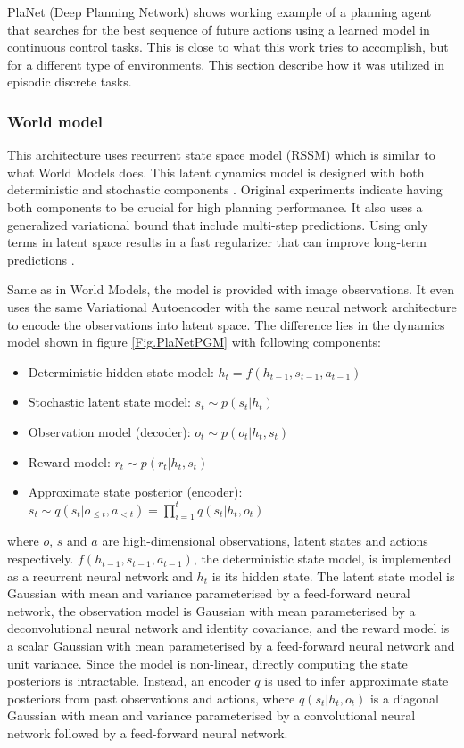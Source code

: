 PlaNet (Deep Planning Network) \cite{Algo.PlaNet} shows working example of a planning agent that searches for the best sequence of future actions using a learned model in continuous control tasks. This is close to what this work tries to accomplish, but for a different type of environments. This section describe how it was utilized in episodic discrete tasks.

\subsubsection{World model}

This architecture uses recurrent state space model (RSSM) which is similar to what World Models does. This latent dynamics model is designed with both deterministic and stochastic components \cite{Algo.FastGenerativeModels}. Original experiments indicate having both components to be crucial for high planning performance. It also uses a generalized variational bound that include multi-step predictions. Using only terms in latent space results in a fast regularizer that can improve long-term predictions \cite{Algo.PlaNet}.

Same as in World Models, the model is provided with image observations. It even uses the same Variational Autoencoder with the same neural network architecture to encode the observations into latent space. The difference lies in the dynamics model shown in figure \ref{Fig.PlaNetPGM} with following components:
\begin{itemize}
\item Deterministic hidden state model:      $h_t = f(h_{t-1}, s_{t-1}, a_{t-1})$
\item Stochastic latent state model:         $s_t \sim p(s_t|h_t)$
\item Observation model (decoder):           $o_t \sim p(o_t|h_t, s_t)$
\item Reward model:                          $r_t \sim p(r_t|h_t, s_t)$
\item Approximate state posterior (encoder): $s_t \sim q(s_t|o_{\leqslant t}, a_{< t}) = \prod_{i=1}^tq(s_t|h_t,o_t)$
\end{itemize}
where $o$, $s$ and $a$ are high-dimensional observations, latent states and actions respectively. $f(h_{t-1}, s_{t-1}, a_{t-1})$, the deterministic state model, is implemented as a recurrent neural network and $h_t$ is its hidden state. The latent state model is Gaussian with mean and variance parameterised by a feed-forward neural network, the observation model is Gaussian with mean parameterised by a deconvolutional neural network and identity covariance, and the reward model is a scalar Gaussian with mean parameterised by a feed-forward neural network and unit variance. Since the model is non-linear, directly computing the state posteriors is intractable. Instead, an encoder $q$ is used to infer approximate state posteriors from past observations and actions, where $q(s_t | h_t, o_t)$ is a diagonal Gaussian with mean and variance parameterised by a convolutional neural network followed by a feed-forward neural network.

